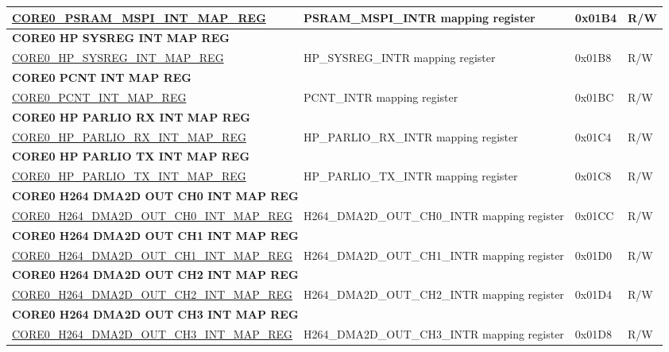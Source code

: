 \begin{longtable}{ | p{7.5cm} | p{7.2cm} | p{1.3cm} | p{1cm} | }
\hyperref[regdesc:CORE0PSRAMMSPIINTMAPREG]{CORE0\_PSRAM\_MSPI\_INT\_MAP\_REG} & PSRAM\_MSPI\_INTR mapping register & 0x01B4 & R/W \\ \hline
\multicolumn{4}{|l|}{\textbf{CORE0 HP SYSREG INT MAP REG}} \\ \hline
\hyperref[regdesc:CORE0HPSYSREGINTMAPREG]{CORE0\_HP\_SYSREG\_INT\_MAP\_REG} & HP\_SYSREG\_INTR mapping register & 0x01B8 & R/W \\ \hline
\multicolumn{4}{|l|}{\textbf{CORE0 PCNT INT MAP REG}} \\ \hline
\hyperref[regdesc:CORE0PCNTINTMAPREG]{CORE0\_PCNT\_INT\_MAP\_REG} & PCNT\_INTR mapping register & 0x01BC & R/W \\ \hline
\multicolumn{4}{|l|}{\textbf{CORE0 HP PARLIO RX INT MAP REG}} \\ \hline
\hyperref[regdesc:CORE0HPPARLIORXINTMAPREG]{CORE0\_HP\_PARLIO\_RX\_INT\_MAP\_REG} & HP\_PARLIO\_RX\_INTR mapping register & 0x01C4 & R/W \\ \hline
\multicolumn{4}{|l|}{\textbf{CORE0 HP PARLIO TX INT MAP REG}} \\ \hline
\hyperref[regdesc:CORE0HPPARLIOTXINTMAPREG]{CORE0\_HP\_PARLIO\_TX\_INT\_MAP\_REG} & HP\_PARLIO\_TX\_INTR mapping register & 0x01C8 & R/W \\ \hline
\multicolumn{4}{|l|}{\textbf{CORE0 H264 DMA2D OUT CH0 INT MAP REG}} \\ \hline
\hyperref[regdesc:CORE0H264DMA2DOUTCH0INTMAPREG]{CORE0\_H264\_DMA2D\_OUT\_CH0\_INT\_MAP\_REG} & H264\_DMA2D\_OUT\_CH0\_INTR mapping register & 0x01CC & R/W \\ \hline
\multicolumn{4}{|l|}{\textbf{CORE0 H264 DMA2D OUT CH1 INT MAP REG}} \\ \hline
\hyperref[regdesc:CORE0H264DMA2DOUTCH1INTMAPREG]{CORE0\_H264\_DMA2D\_OUT\_CH1\_INT\_MAP\_REG} & H264\_DMA2D\_OUT\_CH1\_INTR mapping register & 0x01D0 & R/W \\ \hline
\multicolumn{4}{|l|}{\textbf{CORE0 H264 DMA2D OUT CH2 INT MAP REG}} \\ \hline
\hyperref[regdesc:CORE0H264DMA2DOUTCH2INTMAPREG]{CORE0\_H264\_DMA2D\_OUT\_CH2\_INT\_MAP\_REG} & H264\_DMA2D\_OUT\_CH2\_INTR mapping register & 0x01D4 & R/W \\ \hline
\multicolumn{4}{|l|}{\textbf{CORE0 H264 DMA2D OUT CH3 INT MAP REG}} \\ \hline
\hyperref[regdesc:CORE0H264DMA2DOUTCH3INTMAPREG]{CORE0\_H264\_DMA2D\_OUT\_CH3\_INT\_MAP\_REG} & H264\_DMA2D\_OUT\_CH3\_INTR mapping register & 0x01D8 & R/W \\ \hline

\end{longtable}
